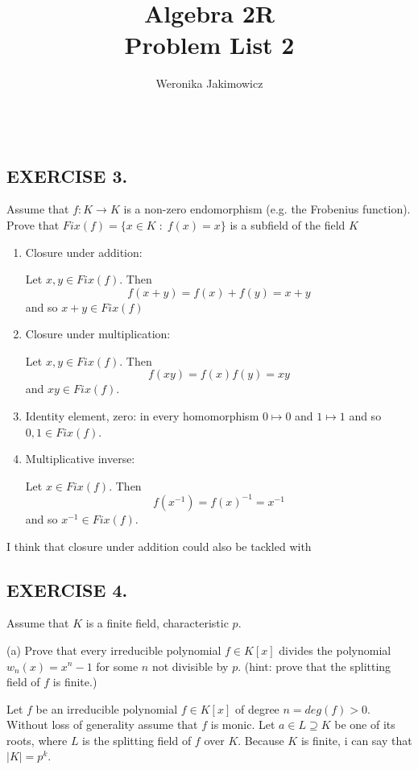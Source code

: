 \documentclass{article}
\title{\large Algebra 2R\smallskip\\ \textbf{Problem List 2}}
\author{\normalsize Weronika Jakimowicz}
\date{~~~}
\begin{document}
\maketitle\thispagestyle{empty}

\subsection*{EXERCISE 3.}
{\color{pink}Assume that $f:K\to K$ is a non-zero endomorphism (e.g. the Frobenius function). Prove that $Fix(f)=\{x\in K\;:\;f(x)=x\}$ is a subfield of the field $K$}
\smallskip

\begin{enumerate}
    \item Closure under addition:

    Let $x,y\in Fix(f)$. Then
    $$f(x+y)=f(x)+f(y)=x+y$$
    and so $x+y\in Fix(f)$

    \item Closure under multiplication:

    Let $x,y\in Fix(f)$. Then
    $$f(xy)=f(x)f(y)=xy$$
    and $xy\in Fix(f)$.

    \item Identity element, zero: in every homomorphism $0\mapsto 0$ and $1\mapsto 1$ and
    so $0,1\in Fix(f)$.

    \item Multiplicative inverse:
    
    Let $x\in Fix(f)$. Then
    $$f(x^{-1})=f(x)^{-1}=x^{-1}$$
    and so $x^{-1}\in Fix(f)$.
\end{enumerate}

I think that closure under addition could also be tackled with 

\subsection*{EXERCISE 4.}
{\color{pink}Assume that $K$ is a finite field, characteristic $p$.

(a) Prove that every irreducible polynomial $f\in K[x]$ divides the polynomial $w_n(x)=x^n-1$ for some $n$ not divisible by $p$. (hint: prove that the splitting field of $f$ is finite.)}

Let $f$ be an irreducible polynomial $f\in K[x]$ of degree $n=deg(f)>0$. Without loss of generality assume that $f$ is monic. Let $a\in L\supseteq K$ be one of its roots, where $L$ is the splitting field of $f$ over $K$. Because $K$ is finite, i can say that $|K|=p^k$.
\smallskip
\end{document}
